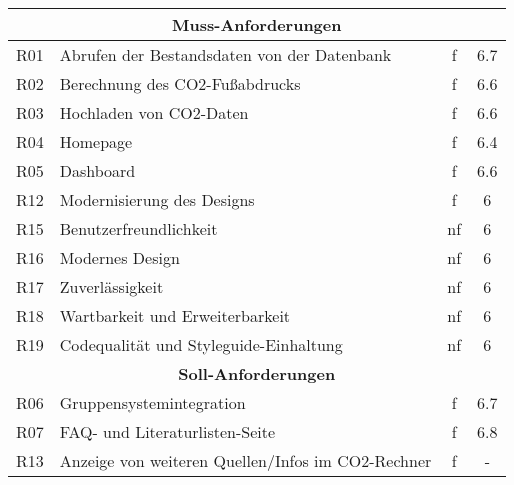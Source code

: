 \begin{longtable}{|c|l|c|c|}
    \multicolumn{4}{|c|}{\textbf{Muss-Anforderungen}}                                                           \\
    \hline
    R01                  & Abrufen der Bestandsdaten von der Datenbank          & f            & 6.7            \\
    \hline
    R02                  & Berechnung des CO2-Fußabdrucks                       & f            & 6.6         \\
    \hline
    R03                  & Hochladen von CO2-Daten                              & f            & 6.6          \\
    \hline
    R04                  & Homepage                                             & f            & 6.4            \\
    \hline
    R05                  & Dashboard                                            & f            & 6.6            \\
    \hline
    R12                  & Modernisierung des Designs                           & f            & 6              \\
    \hline
    R15                  & Benutzerfreundlichkeit                               & nf           & 6              \\
    \hline
    R16                  & Modernes Design                                      & nf           & 6              \\
    \hline
    R17                  & Zuverlässigkeit                                      & nf           & 6              \\
    \hline
    R18                  & Wartbarkeit und Erweiterbarkeit                      & nf           & 6              \\
    \hline
    R19                  & Codequalität und Styleguide-Einhaltung               & nf           & 6              \\
    \hline
    \multicolumn{4}{|c|}{\textbf{Soll-Anforderungen}}                                                           \\
    \hline
    R06                  & Gruppensystemintegration                             & f            & 6.7            \\
    \hline
    R07                  & FAQ- und Literaturlisten-Seite                       & f            & 6.8            \\
    \hline
    R13                  & Anzeige von weiteren Quellen/Infos im CO2-Rechner    & f            & -              \\

\end{longtable}
